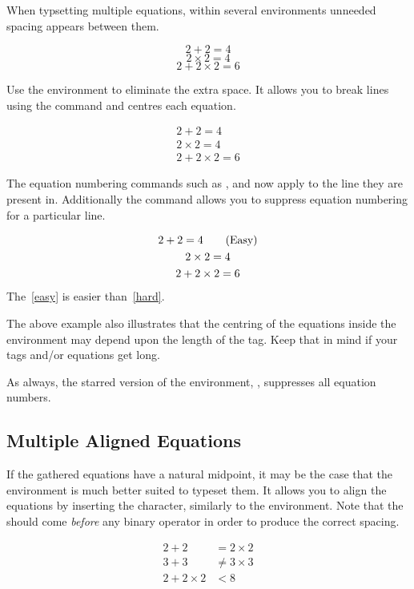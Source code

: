 When typsetting multiple equations, within several  environments
unneeded spacing appears between them.
\begin{example}
\begin{equation}
  2 + 2 = 4
\end{equation}
\begin{equation}
  2 \times 2 = 4
\end{equation}
\begin{equation}
  2 + 2 \times 2 = 6
\end{equation}
\end{example}
Use the  environment to eliminate the extra space. It allows you to break
lines using the \csi{\bs} command and centres each equation.
\begin{example}
\begin{gather}
  2 + 2 = 4 \\
  2 \times 2 = 4 \\
  2 + 2 \times 2 = 6
\end{gather}
\end{example}
The equation numbering commands such as ,  and 
now apply to the line they are present in. Additionally the command
 allows you to suppress equation numbering for a
particular line.
\begin{example}
\begin{gather}
  2 + 2 = 4
    \tag{Easy}\label{easy} \\
  2 \times 2 = 4 \notag \\
  2 + 2 \times 2 = 6
    \label{hard}
\end{gather}
The~\eqref{easy} is easier
than~\eqref{hard}.
\end{example}
The above example also illustrates that the centring of the equations inside
the environment may depend upon the length of the tag. Keep that in mind if
your tags and/or equations get long.

As always, the starred version of the environment, , suppresses
all equation numbers.

\subsection{Multiple Aligned Equations}\label{sec:aligned_equations}

If the gathered equations have a natural midpoint, it may be the case that the
 environment is much better suited to typeset them. It allows you to
align the equations by inserting the \ai{\&} character, similarly to the
 environment. Note that the \ai{\&} should come \emph{before} any
binary operator in order to produce the correct spacing.
\begin{example}
\begin{align}
  2 + 2 & = 2 \times 2 \\
  3 + 3 & \neq 3 \times 3 \\
  2 + 2 \times 2 & < 8
\end{align}
\end{example}

